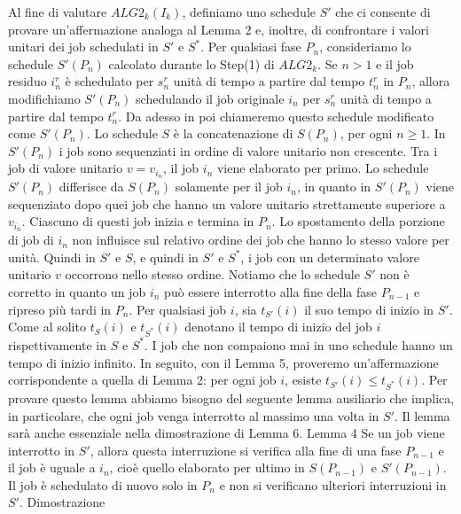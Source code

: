 \documentclass[12pt]{article}
\begin{document}
Al fine di valutare $ALG2_{k}(I_{k})$, definiamo uno schedule $S'$ che ci consente di provare un'affermazione analoga al Lemma 2 e, inoltre, di confrontare i valori unitari dei job schedulati in $S'$ e $S^{*}$. Per qualsiasi fase $P_{n}$, consideriamo lo schedule $S'(P_{n})$ calcolato durante lo Step(1) di $ALG2_{k}$. Se $n > 1$ e il job residuo $i^{r}_{n}$ è schedulato per $s^{r}_{n}$ unità di tempo a partire dal tempo $t^{r}_{n}$ in $P_{n}$, allora modifichiamo $S'(P_{n})$ schedulando il job originale $i_{n}$ per $s^{r}_{n}$ unità di tempo a partire dal tempo $t^{r}_{n}$. Da adesso in poi chiameremo questo schedule modificato come $S'(P_{n})$. Lo schedule $S$ è la concatenazione di $S(P_{n})$, per ogni $n \geq 1$.
In $S'(P_{n})$ i job sono sequenziati in ordine di valore unitario non crescente. Tra i job di valore unitario $v = v_{i_{n}}$, il job $i_{n}$ viene elaborato per primo. Lo schedule $S'(P_{n})$ differisce da $S(P_{n})$ solamente per il job $i_{n}$, in quanto in $S'(P_{n})$ viene sequenziato dopo quei job che hanno un valore unitario strettamente superiore a $v_{i_{n}}$. Ciascuno di questi job inizia e termina in $P_{n}$. Lo spostamento della porzione di job di $i_{n}$ non influisce sul relativo ordine dei job che hanno lo stesso valore per unità. Quindi in $S'$ e $S$, e quindi in $S'$ e $S^{*}$, i job con un determinato valore unitario $v$ occorrono nello stesso ordine. Notiamo che lo schedule $S'$ non è corretto in quanto un job $i_{n}$ può essere interrotto alla fine della fase $P_{n-1}$ e ripreso più tardi in $P_{n}$.
Per qualsiasi job $i$, sia $t_{S'}(i)$ il suo tempo di inizio in $S'$. Come al solito $t_{S}(i)$ e $t_{S^{*}}(i)$ denotano il tempo di inizio del job $i$ rispettivamente in $S$ e $S^{*}$. I job che non compaiono mai in uno schedule hanno un tempo di inizio infinito. In seguito, con il Lemma 5, proveremo un'affermazione corrispondente a quella di Lemma 2: per ogni job $i$, esiste $t_{S'}(i) \leq  t_{S^{*}}(i)$. Per provare questo lemma abbiamo bisogno del seguente lemma ausiliario che implica, in particolare, che ogni job venga interrotto al massimo una volta in $S'$. Il lemma sarà anche essenziale nella dimostrazione di Lemma 6.
Lemma 4
Se un job viene interrotto in $S'$, allora questa interruzione si verifica alla fine di una fase $P_{n-1}$ e il job è uguale a $i_{n}$, cioè quello elaborato per ultimo in $S(P_{n-1})$ e $S'(P_{n-1})$. Il job è schedulato di nuovo solo in $P_{n}$ e non si verificano ulteriori interruzioni in $S'$.
Dimostrazione
\end{document}
